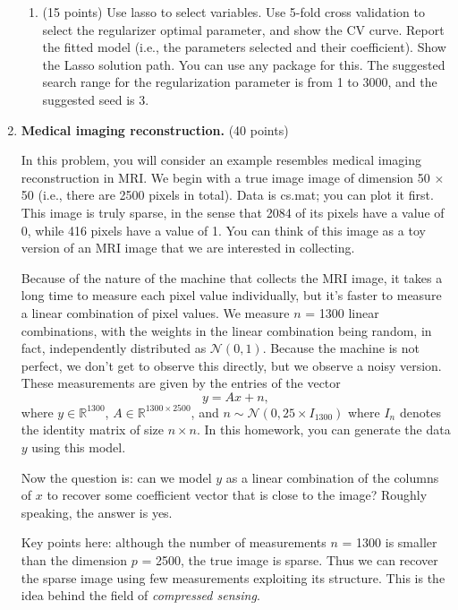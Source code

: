 \documentclass[twoside,10pt]{article}
\begin{document}
\begin{enumerate}
\begin{enumerate}
\item (15 points) Use lasso to select variables. Use 5-fold cross validation to select the regularizer optimal parameter, and show the CV curve.  Report the fitted model (i.e., the parameters selected and their coefficient). Show the Lasso solution path. You can use any package for this. The suggested search range for the regularization parameter is from 1 to 3000, and the suggested seed is 3.

\end{enumerate}


\clearpage
\item {\bf Medical imaging reconstruction.} (40 points)

In this problem, you will consider an example resembles medical imaging reconstruction in MRI.  We begin with a true image image of dimension 50 $\times$ 50 (i.e., there are 2500 pixels in total). Data is \textsf{cs.mat}; you can plot it first. This image is truly sparse, in the sense that 2084 of its pixels have a value of 0, while 416 pixels have a value of 1. You can think of this image as a toy version of an MRI image that we are interested in collecting.

Because of the nature of the machine that collects the MRI image, it takes a long time to measure each pixel value individually, but it's faster to measure a linear combination of pixel values. We measure $n$ = 1300 linear combinations, with the weights in the linear combination being random, in fact, independently distributed as $\mathcal{N}(0,1)$. Because the machine is not perfect, we don't get to observe this directly, but we observe a noisy version. These measurements are given by the entries of the vector
\[
y = A x + n,
\]
where $y \in \mathbb R^{1300}$, $A \in \mathbb R^{1300\times 2500}$, and $n \sim \mathcal N(0, 25\times I_{1300})$ where $I_n$ denotes the identity matrix of size $n\times n$. In this homework, you can generate the data $y$ using this model. 

Now the question is: can we model $y$ as a linear combination of the columns of $x$ to recover some coefficient vector that is close to the image? Roughly speaking, the answer is yes. 

Key points here: although the number of measurements $n$ = 1300 is smaller than the dimension $p$ = 2500, the true image is sparse. Thus we can recover the sparse image using few measurements exploiting its structure. This is the idea behind the field of \textit{compressed sensing}. 


\end{enumerate}
\end{document}
